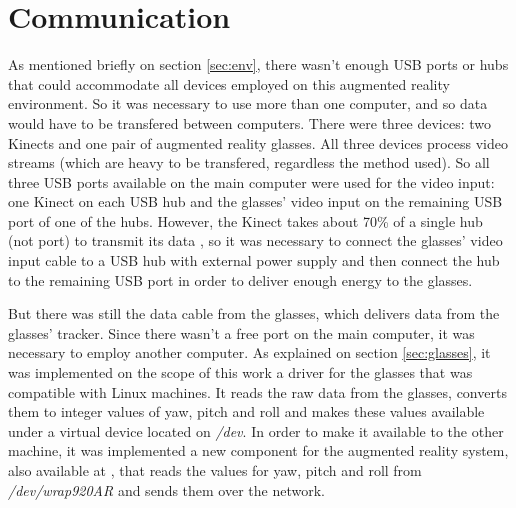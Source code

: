 \documentclass[msc, a4paper, classic, en]{ufbathesis}
\begin{document}
\section{Communication}
\label{sec:comm}

As mentioned briefly on section \ref{sec:env}, there wasn't enough USB ports or hubs that could accommodate all devices employed on this augmented reality environment. So it was necessary to use more than one computer, and so data would have to be transfered between computers. There were three devices: two Kinects and one pair of augmented reality glasses. All three devices process video streams (which are heavy to be transfered, regardless the method used). So all three USB ports available on the main computer were used for the video input: one Kinect on each USB hub and the glasses' video input on the remaining USB port of one of the hubs. However, the Kinect takes about 70\% of a single hub (not port) to transmit its data \cite{kinecthacks}, so it was necessary to connect the glasses' video input cable to a USB hub with external power supply and then connect the hub to the remaining USB port in order to deliver enough energy to the glasses.

But there was still the data cable from the glasses, which delivers data from the glasses' tracker. Since there wasn't a free port on the main computer, it was necessary to employ another computer. As explained on section \ref{sec:glasses}, it was implemented on the scope of this work a driver for the glasses that was compatible with Linux machines. It reads the raw data from the glasses, converts them to integer values of yaw, pitch and roll and makes these values available under a virtual device located on \textit{/dev}. In order to make it available to the other machine, it was implemented a new component for the augmented reality system, also available at \cite{masterproject}, that reads the values for yaw, pitch and roll from \textit{/dev/wrap920AR} and sends them over the network.
\end{document}
